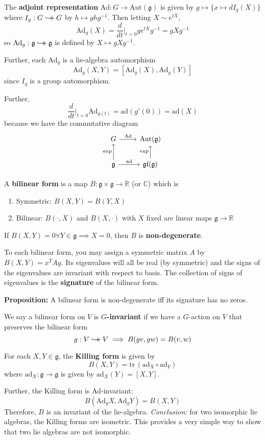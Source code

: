 \documentclass[12pt]{article}
\newcommand{\R}{\mathbb{R}}
\newcommand{\C}{\mathbb{C}}
\newcommand{\tr}{\text{tr}\,}
\newcommand{\biject}{\hookrightarrow \hspace{-8pt} \rightarrow}
\newcommand{\g}{\mathfrak{g}}
\newcommand{\gl}{\mathfrak{gl}}
\newcommand{\Ad}{\text{Ad}}
\newcommand{\ad}{\text{ad}}
\newcommand{\Aut}{\text{Aut}}
\begin{document}
The \textbf{adjoint representation} $\Ad: G \to \Aut(\g)$ is given by $g \mapsto \{x \mapsto dI_g(X)\}$ where $I_g: G \biject G$ by $h \mapsto ghg^{-1}$. Then letting $X \sim e^{tX}$, 
\[\Ad_g(X) = \frac{d}{dt}\bigg\vert_{t=0} ge^{tX}g^{-1} = gXg^{-1}\]
so $\Ad_g: \g \biject \g$ is defined by $X \mapsto gXg^{-1}$. 

Further, each $\Ad_g$ is a lie-algebra automorphism 
\[\Ad_g({X, Y}) = [\Ad_g(X), \Ad_g(Y)]\]
since $I_g$ is a group automorphism.

Further, 
\[\frac{d}{dt}\bigg\vert_{t=0} \Ad_{g(t)} = \ad(g'(0)) = \ad(X)\] 
because we have the commutative diagram 
\[\begin{tikzcd}
    G \arrow{r}{\Ad} & \Aut(\g)\\ 
    \g \arrow{u}{\exp} \arrow{r}{\ad} & \gl(\g) \arrow{u}{\exp}
\end{tikzcd}\]

A \textbf{bilinear form} is a map $B: \g \times \g \to \R$ (or $\C$) which is 
\begin{enumerate}
    \item Symmetric: $B(X, Y) = B(Y, X)$
    \item Bilinear: $B(\cdot, X)$ and $B(X, \cdot)$ with $X$ fixed are linear maps $\g \to \R$ 
\end{enumerate}

If $B(X, Y) = 0 \forall Y \in \g \implies X = 0$, then $B$ is \textbf{non-degenerate}.

To each bilinear form, you may assign a symmetric matrix $A$ by $B(X, Y) = x^T Ay$. Its eigenvalues will all be real (by symmetric) and the signs of the eigenvalues are invariant with respect to basis. The collection of signs of eigenvalues is the \textbf{signature} of the bilinear form. 

\textbf{Proposition:} A bilinear form is non-degenerate iff its signature has no zeros. 

We say a bilinear form on $V$ is \textbf{$G$-invariant} if we have a $G$-action on $V$ that preserves the bilinear form 
\[g: V \biject V \implies B(gv, gw) = B(v, w)\] 

For each $X, Y \in \g$, the \textbf{Killing form} is given by 
\[B(X, Y) = \tr(\ad_X \circ \ad_Y)\]
where $\ad_X: \g \to \g$ is given by $\ad_X(Y) = [X, Y]$.

Further, the Killing form is Ad-invariant:
\[B(\Ad_g X, \Ad_g Y) = B(X, Y)\]
Therefore, $B$ is an invariant of the lie-algebra. \emph{Conclusion:} for two isomorphic lie algebras, the Killing forms are isometric. This provides a very simple way to show that two lie algebras are not isomorphic.
\end{document}
